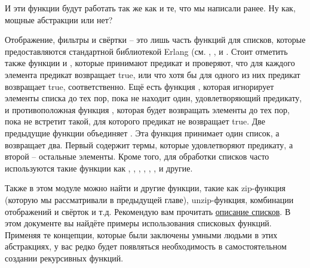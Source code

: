 И эти функции будут работать так же как и те, что мы написали ранее.
Ну как, мощные абстракции или нет?

Отображение, фильтры и свёртки \--- это лишь часть функций для списков, которые предоставляются стандартной библиотекой Erlang (см. , ,  и .
Стоит отметить также функции  и , которые принимают предикат и проверяют, что для каждого элемента предикат возвращает true, или что хотя бы для одного из них предикат возвращает true, соответственно.
Ещё есть функция , которая игнорирует элементы списка до тех пор, пока не находит один, удовлетворяющий предикату, и противоположная функция , которая будет возвращать элементы до тех пор, пока не встретит такой, для которого предикат не возвращает true.
Две предыдущие функции объединяет .
Эта функция принимает один список, а возвращает два.
Первый содержит термы, которые удовлетворяют предикату, а второй \--- остальные элементы. Кроме того, для обработки списков часто используются такие функции как , , , , , ,  и другие.

Также в этом модуле можно найти и другие функции, такие как zip\--функция (которую мы рассматривали в предыдущей главе), unzip\--функция, комбинации отображений и свёрток и т.д.
Рекомендую вам прочитать \href{http://erldocs.com/R15B/stdlib/lists.html}{описание списков}.
В этом документе вы найдёте примеры использования списковых функций.
Применяя те концепции, которые были заключены умными людьми в этих абстракциях, у вас редко будет появляться необходимость в самостоятельном создании рекурсивных функций.
